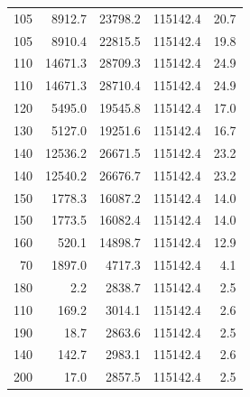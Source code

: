 \begin{table}[htbp]
\begin{tabular}{rrrrr}
    105 & \num{8912.7} & \num{23798.2} & \num{115142.4} & 20.7 \\
    105 & \num{8910.4} & \num{22815.5} & \num{115142.4} & 19.8 \\
    110 & \num{14671.3} & \num{28709.3} & \num{115142.4} & 24.9 \\
    110 & \num{14671.3} & \num{28710.4} & \num{115142.4} & 24.9 \\
    120 & \num{5495.0} & \num{19545.8} & \num{115142.4} & 17.0 \\
    130 & \num{5127.0} & \num{19251.6} & \num{115142.4} & 16.7 \\
    140 & \num{12536.2} & \num{26671.5} & \num{115142.4} & 23.2 \\
    140 & \num{12540.2} & \num{26676.7} & \num{115142.4} & 23.2 \\
    150 & \num{1778.3} & \num{16087.2} & \num{115142.4} & 14.0 \\
    150 & \num{1773.5} & \num{16082.4} & \num{115142.4} & 14.0 \\
    160 & \num{520.1} & \num{14898.7} & \num{115142.4} & 12.9 \\
    70 & \num{1897.0} & \num{4717.3} & \num{115142.4} & 4.1 \\
    180 & \num{2.2} & \num{2838.7} & \num{115142.4} & 2.5 \\
    110 & \num{169.2} & \num{3014.1} & \num{115142.4} & 2.6 \\
    190 & \num{18.7} & \num{2863.6} & \num{115142.4} & 2.5 \\
    140 & \num{142.7} & \num{2983.1} & \num{115142.4} & 2.6 \\
    200 & \num{17.0} & \num{2857.5} & \num{115142.4} & 2.5 \\
    \bottomrule
  \end{tabular}
\end{table}
